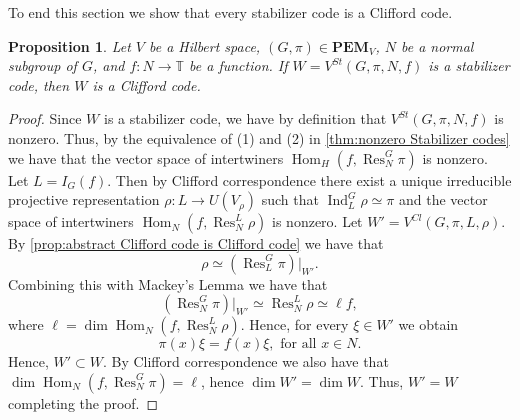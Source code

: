 \documentclass[11pt, oneside, reqno]{amsart}
\newcommand{\bbT}{\mathbb{T}}
\newcommand{\PEM}{\mathbf{PEM}}
\newcommand{\Hom}{\operatorname{Hom}}
\newcommand{\Res}{\operatorname{Res}}
\newcommand{\Ind}{\operatorname{Ind}}
\theoremstyle{definition}
\theoremstyle{plain}
\newtheorem{proposition}[definition]{Proposition}
\theoremstyle{remark}
\begin{document}
To end this section we show that every stabilizer code is a Clifford code.

\begin{proposition}\label{prop:stabilizer codes are Clifford codes}
    Let $V$ be a Hilbert space, $(G,\pi) \in \PEM_V$, $N$ be a normal subgroup of $G$, and $f \colon N \to \bbT$ be a function. If $W = V^{St}(G,\pi,N,f)$ is a stabilizer code, then $W$ is a Clifford code.
\end{proposition}
\begin{proof}
    Since $W$ is a stabilizer code, we have by definition that $V^{St}(G,\pi,N,f)$ is nonzero. Thus, by the equivalence of (1) and (2) in \cref{thm:nonzero Stabilizer codes} we have that the vector space of intertwiners $\Hom_H(f, \Res^G_N\pi)$ is nonzero. Let $L = I_G(f)$. Then by Clifford correspondence there exist a unique irreducible projective representation $\rho \colon L \to U(V_\rho)$ such that $\Ind^G_L\rho \simeq \pi$ and the vector space of intertwiners $\Hom_N(f,\Res^L_N\rho)$ is nonzero. Let $W' = V^{Cl}(G,\pi,L,\rho)$. By \cref{prop:abstract Clifford code is Clifford code} we have that
    \begin{equation*}
        \rho \simeq (\Res^G_L\pi)|_{W'}.
    \end{equation*}
    Combining this with Mackey's Lemma we have that
    \begin{equation*}
        (\Res^G_N\pi)|_{W'} \simeq \Res^L_N\rho \simeq \ell f,
    \end{equation*}
    where $\ell = \dim\Hom_N(f,\Res^L_N\rho)$. Hence, for every $\xi \in W'$ we obtain
    \begin{equation*}
        \pi(x) \xi = f(x) \xi, \text{ for all } x \in N.
    \end{equation*}
    Hence, $W' \subset W$. By Clifford correspondence we also have that $\dim \Hom_N(f,\Res^G_N\pi) = \ell$, hence $\dim W' = \dim W$. Thus, $W' = W$ completing the proof.
\end{proof}
\end{document}
